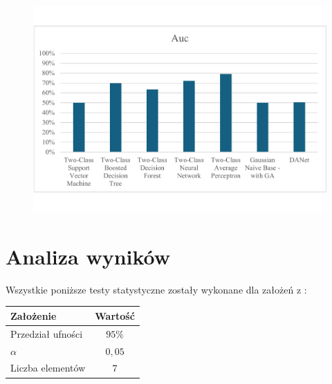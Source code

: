 \begin{figure}[H]
    \centering
    \includegraphics[width=\textwidth]{images/auc-res}
    \label{fig:auc-res}
\end{figure}


\section{Analiza wyników}
Wszystkie poniższe testy statystyczne zostały wykonane dla założeń z :

\begin{table}[H]
    \centering
    \begin{tabular}{|l|c|} \hline
        \textbf{Założenie} & \textbf{Wartość} \\ \hline
        Przedział ufności & $95\%$ \\ \hline
        $\alpha$ & $0,05$ \\ \hline
        Liczba elementów & $7$ \\ \hline
    \end{tabular}
    \label{tab:stat}
\end{table}

